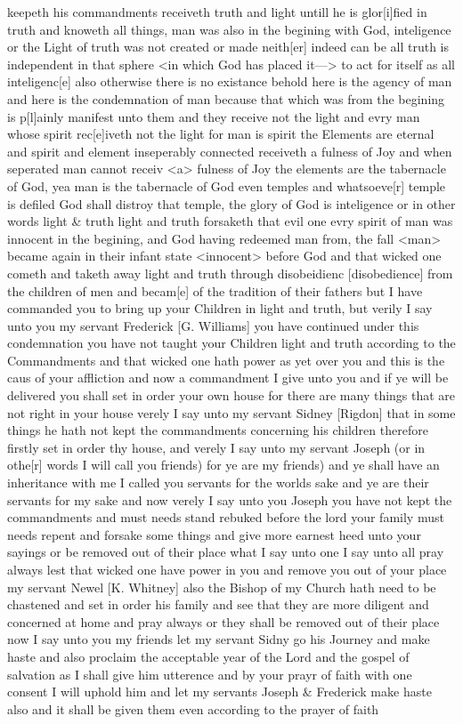 keepeth his commandments receiveth truth and light untill he is glor[i]fied in truth and knoweth all things, man was also in the begining with God, inteligence or the Light of truth was not created or made neith[er] indeed can be all truth is independent in that sphere <in which God has placed it---> to act for itself as all inteligenc[e] also otherwise there is no existance behold here is the agency of man and here is the condemnation of man because that which was from the begining is p[l]ainly manifest unto them and they receive not the light and evry man whose spirit rec[e]iveth not the light for man is spirit the Elements are eternal and spirit and element inseperably connected receiveth a fulness of Joy and when seperated man cannot receiv <a> fulness of Joy the elements are the tabernacle of God, yea man is the tabernacle of God even temples and whatsoeve[r] temple is defiled God shall distroy that temple, the glory of God is inteligence or in other words light \& truth light and truth forsaketh that evil one evry spirit of man was innocent in the begining, and God having redeemed man from, the fall <man> became again in their infant state <innocent> before God and that wicked one cometh and taketh away light and truth through disobeidienc [disobedience] from the children of men and becam[e] of the tradition of their fathers but I have commanded you to bring up your Children in light and truth, but verily I say unto you my servant Frederick [G. Williams] you have continued under this condemnation you have not taught your Children light and truth according to the Commandments and that wicked one hath power as yet over you and this is the caus of your affliction and now a commandment I give unto you and if ye will be delivered you shall set in order your own house for there are many things that are not right in your house verely I say unto my servant Sidney [Rigdon] that in some things he hath not kept the commandments concerning his children therefore firstly set in order thy house, and verely I say unto my servant Joseph (or in othe[r] words I will call you friends) for ye are my friends) and ye shall have an inheritance with me I called you servants for the worlds sake and ye are their servants for my sake and now verely I say unto you Joseph you have not kept the commandments and must needs stand rebuked before the lord your family must needs repent and forsake some things and give more earnest heed unto your sayings or be removed out of their place what I say unto one I say unto all pray always lest that wicked one have power in you and remove you out of your place my servant Newel [K. Whitney] also the Bishop of my Church hath need to be chastened and set in order his family and see that they are more diligent and concerned at home and pray always or they shall be removed out of their place now I say unto you my friends let my servant Sidny go his Journey and make haste and also proclaim the acceptable year of the Lord and the gospel of salvation as I shall give him utterence and by your prayr of faith with one consent I will uphold him and let my servants Joseph \& Frederick make haste also and it shall be given them even according to the prayer of faith
				
